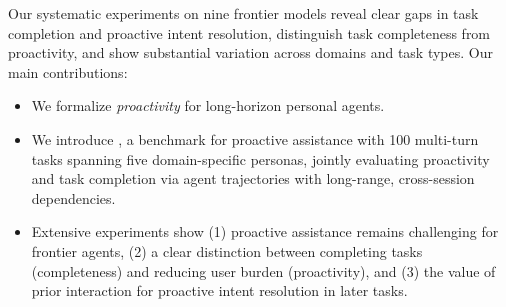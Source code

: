 Our systematic experiments on nine frontier models reveal clear gaps in task completion and proactive intent resolution, distinguish task completeness from proactivity, and show substantial variation across domains and task types. Our main contributions:
\begin{itemize}[leftmargin=10pt, topsep=0pt, itemsep=1pt, partopsep=1pt, parsep=1pt]
    \item We formalize \emph{proactivity} for long-horizon personal agents.

    \item We introduce {\bench}, a benchmark for proactive assistance with 100 multi-turn tasks spanning five domain-specific personas, jointly evaluating proactivity and task completion via agent trajectories with long-range, cross-session dependencies.



    \item Extensive experiments show (1) proactive assistance remains challenging for frontier agents, (2) a clear distinction between completing tasks (completeness) and reducing user burden (proactivity), and (3) the value of prior interaction for proactive intent resolution in later tasks.
\end{itemize}






